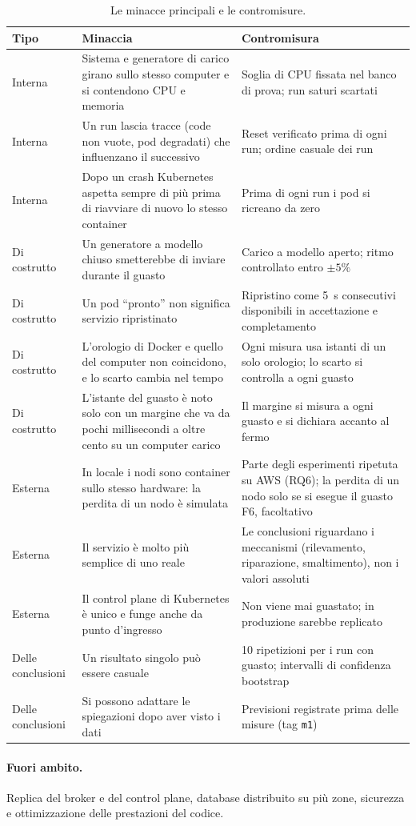 \begin{table}[H]
\centering
\caption{Le minacce principali e le contromisure.}
\label{tab:limiti}
\small
\begin{tabularx}{\linewidth}{@{}>{\raggedright\arraybackslash}p{1.8cm}LL@{}}
\toprule
\textbf{Tipo} & \textbf{Minaccia} & \textbf{Contromisura} \\
\midrule
Interna & Sistema e generatore di carico girano sullo stesso computer e si contendono CPU e memoria & Soglia di CPU fissata nel banco di prova; run saturi scartati \\
Interna & Un run lascia tracce (code non vuote, pod degradati) che influenzano il successivo & Reset verificato prima di ogni run; ordine casuale dei run \\
Interna & Dopo un crash Kubernetes aspetta sempre di più prima di riavviare di nuovo lo stesso container & Prima di ogni run i pod si ricreano da zero \\
Di costrutto & Un generatore a modello chiuso smetterebbe di inviare durante il guasto & Carico a modello aperto; ritmo controllato entro $\pm 5\%$ \\
Di costrutto & Un pod ``pronto'' non significa servizio ripristinato & Ripristino come 5~s consecutivi disponibili in accettazione e completamento \\
Di costrutto & L'orologio di Docker e quello del computer non coincidono, e lo scarto cambia nel tempo & Ogni misura usa istanti di un solo orologio; lo scarto si controlla a ogni guasto \\
Di costrutto & L'istante del guasto è noto solo con un margine che va da pochi millisecondi a oltre cento su un computer carico & Il margine si misura a ogni guasto e si dichiara accanto al fermo \\
Esterna & In locale i nodi sono container sullo stesso hardware: la perdita di un nodo è simulata & Parte degli esperimenti ripetuta su AWS (RQ6); la perdita di un nodo solo se si esegue il guasto F6, facoltativo \\
Esterna & Il servizio è molto più semplice di uno reale & Le conclusioni riguardano i meccanismi (rilevamento, riparazione, smaltimento), non i valori assoluti \\
Esterna & Il control plane di Kubernetes è unico e funge anche da punto d'ingresso & Non viene mai guastato; in produzione sarebbe replicato \\
Delle conclusioni & Un risultato singolo può essere casuale & 10 ripetizioni per i run con guasto; intervalli di confidenza bootstrap \\
Delle conclusioni & Si possono adattare le spiegazioni dopo aver visto i dati & Previsioni registrate prima delle misure (tag \texttt{m1}) \\
\bottomrule
\end{tabularx}
\end{table}

\paragraph{Fuori ambito.} Replica del broker e del control plane, database distribuito su più zone, sicurezza e ottimizzazione delle prestazioni del codice.
